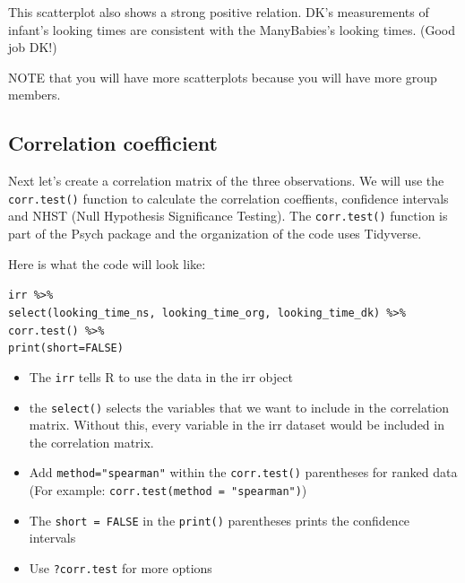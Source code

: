 \documentclass[
]{book}
\newenvironment{Shaded}{\begin{snugshade}}{\end{snugshade}}
\newcommand{\DataTypeTok}[1]{\textcolor[rgb]{0.13,0.29,0.53}{#1}}
\newcommand{\KeywordTok}[1]{\textcolor[rgb]{0.13,0.29,0.53}{\textbf{#1}}}
\newcommand{\NormalTok}[1]{#1}
\newcommand{\OperatorTok}[1]{\textcolor[rgb]{0.81,0.36,0.00}{\textbf{#1}}}
\newcommand{\OtherTok}[1]{\textcolor[rgb]{0.56,0.35,0.01}{#1}}
\newcommand{\StringTok}[1]{\textcolor[rgb]{0.31,0.60,0.02}{#1}}
\providecommand{\tightlist}{%
  \setlength{\itemsep}{0pt}\setlength{\parskip}{0pt}}
\begin{document}
This scatterplot also shows a strong positive relation. DK's measurements of infant's looking times are consistent with the ManyBabies's looking times. (Good job DK!)

NOTE that you will have more scatterplots because you will have more group members.

\hypertarget{correlation-coefficient}{%
\subsection{Correlation coefficient}\label{correlation-coefficient}}

Next let's create a correlation matrix of the three observations. We will use the \texttt{corr.test()} function to calculate the correlation coeffients, confidence intervals and NHST (Null Hypothesis Significance Testing). The \texttt{corr.test()} function is part of the Psych package and the organization of the code uses Tidyverse.

Here is what the code will look like:

\texttt{irr\ \%\textgreater{}\%}\\
\texttt{select(looking\_time\_ns,\ looking\_time\_org,\ looking\_time\_dk)\ \%\textgreater{}\%}~\\
\texttt{corr.test()\ \%\textgreater{}\%}~\\
\texttt{print(short=FALSE)}

\begin{itemize}
\tightlist
\item
  The \texttt{irr} tells R to use the data in the irr object\\
\item
  the \texttt{select()} selects the variables that we want to include in the correlation matrix. Without this, every variable in the irr dataset would be included in the correlation matrix.\\
\item
  Add \texttt{method="spearman"} within the \texttt{corr.test()} parentheses for ranked data (For example: \texttt{corr.test(method\ =\ "spearman")})\\
\item
  The \texttt{short\ =\ FALSE} in the \texttt{print()} parentheses prints the confidence intervals\\
\item
  Use \texttt{?corr.test} for more options
\end{itemize}

\begin{Shaded}
\end{Shaded}
\end{document}
